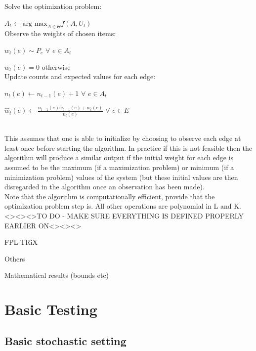 Solve the optimization problem:

\indent \indent $A_t \leftarrow \textrm{arg max}_{A\in \Theta}f(A,U_t)$\\

Observe the weights of chosen items:

\indent \indent $w_t(e) \sim P_e$ $\forall$ $e \in A_t$

\indent \indent $w_t(e)=0$ otherwise\\

Update counts and expected values for each edge:

\indent \indent $n_t(e) \leftarrow n_{t-1}(e) + 1$ $\forall$ $e \in A_t$

\indent \indent $\hat{w}_t(e) \leftarrow \frac{n_{t-1}(e)\hat{w}_{t-1}(e)+w_t(e)}{n_t(e)}$ $\forall$ $e \in E$

\noindent \hrulefill\\

This assumes that one is able to initialize by choosing to observe each edge at least once before starting the algorithm. In practice if this is not feasible then the algorithm will produce a similar output if the initial weight for each edge is assumed to be the maximum (if a maximization problem) or minimum (if a minimization problem) values of the system (but these initial values are then disregarded in the algorithm once an observation has been made).\\

Note that the algorithm is computationally efficient, provide that the optimization problem step is. All other operations are polynomial in L and K.\\

<><><>TO DO - MAKE SURE EVERYTHING IS DEFINED PROPERLY EARLIER ON<><><>


FPL-TRiX

Others

Mathematical results (bounds etc)	


\pagebreak


\section{Basic Testing}

\subsection{Basic stochastic setting}

